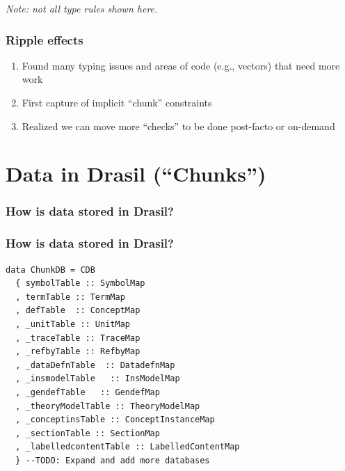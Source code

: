 \documentclass[xcolor={dvipsnames}]{beamer}
\begin{document}
\begin{frame}
\begin{columns}
\begin{column}{0.475\textwidth}
\begin{center}
      \end{center}
    \end{column}
  \end{columns}

  \vfill
  {\tiny \hfill \emph{Note: not all type rules shown here.}}
\end{frame}

\begin{frame}
  \frametitle{Ripple effects}

  \begin{enumerate}
    \item Found many typing issues and areas of code (e.g., vectors) that need
          more work
    \item First capture of implicit ``chunk'' constraints
    \item Realized we can move more ``checks'' to be done post-facto or
          on-demand
  \end{enumerate}

\end{frame}

\section{Data in Drasil (\textquotedblleft{}Chunks\textquotedblright{})}

\begin{frame}
  \frametitle{How is data stored in Drasil?}

  \centering
  

\end{frame}

\begin{frame}[fragile]
  \frametitle{How is data stored in Drasil?}

\begin{verbatim}
data ChunkDB = CDB 
  { symbolTable :: SymbolMap
  , termTable :: TermMap 
  , defTable  :: ConceptMap
  , _unitTable :: UnitMap
  , _traceTable :: TraceMap
  , _refbyTable :: RefbyMap
  , _dataDefnTable  :: DatadefnMap
  , _insmodelTable   :: InsModelMap
  , _gendefTable   :: GendefMap
  , _theoryModelTable :: TheoryModelMap
  , _conceptinsTable :: ConceptInstanceMap
  , _sectionTable :: SectionMap
  , _labelledcontentTable :: LabelledContentMap
  } --TODO: Expand and add more databases
\end{verbatim}

\end{frame}
\end{document}
